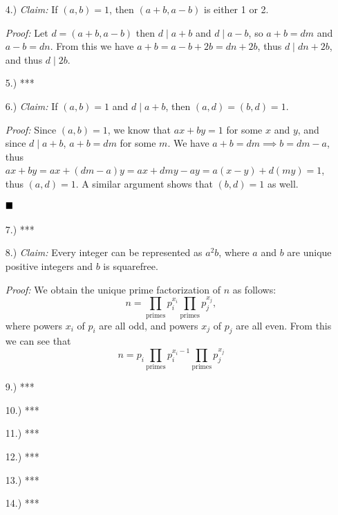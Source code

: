 \documentclass[12pt]{article}
\newcommand{\claim}{\textit{Claim: }}
\newcommand{\proof}{\textit{Proof: }}
\newcommand{\done}{
    \ensuremath{\strut\hfill\blacksquare}
}
\begin{document}
\begin{itemize}
        \item [4.)] \claim If $(a,b) = 1$, then $(a + b, a - b)$ is either 1
        or 2.

        \proof Let $d = (a + b, a - b)$ then $d \mid a + b$ and $d \mid a - b$,
        so $a + b = dm$ and $a - b = dn$.
        From this we have $a + b = a - b + 2b = dn + 2b$, thus
        $d \mid dn + 2b$, and thus $d \mid 2b$.

        \item [5.)] ***

        \item [6.)] \claim If $(a,b) = 1$ and $d \mid a + b$, then
        $(a,d) = (b,d) = 1$.

        \proof Since $(a,b) = 1$, we know that $ax + by = 1$ for some $x$ and
        $y$, and since $d \mid a + b$, $a + b = dm$ for some $m$.
        We have $a + b = dm \implies b = dm - a$, thus
        $ax+by=ax + (dm - a)y = ax + dmy - ay = a(x-y)+d(my)=1$,
        thus $(a,d) = 1$.
        A similar argument shows that $(b,d) = 1$ as well.
        \done

        \item [7.)] ***

        \item [8.)] \claim Every integer can be represented as $a^2b$, where
        $a$ and $b$ are unique positive integers and $b$ is squarefree.

        \proof We obtain the unique prime factorization of $n$ as follows:
        \[
            n
            = \prod_{\text{primes}} p_i^{x_i} \prod_{\text{primes}} p_j^{x_j}
            ,
        \]
        where powers $x_i$ of $p_i$ are all odd, and powers $x_j$ of $p_j$
        are all even.
        From this we can see that
        \[
            n
            = p_i \prod_{\text{primes}} p_i^{x_i - 1}
            \prod_{\text{primes}} p_j^{x_j}
        \]
        

        \item [9.)] ***

        \item [10.)] ***

        \item [11.)] ***

        \item [12.)] ***

        \item [13.)] ***

        \item [14.)] ***


\end{itemize}
\end{document}
